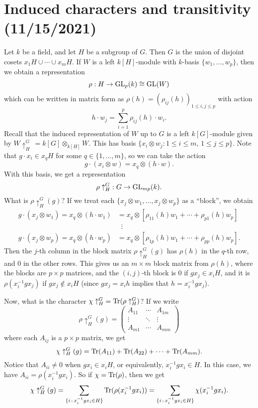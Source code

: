 \section{Induced characters and transitivity (11/15/2021)}
Let $k$ be a field, and let $H$ be a subgroup of $G$. Then $G$ is the 
union of disjoint cosets $x_1H \cup \cdots \cup x_mH$. If $W$ is a 
left $k[H]$-module with $k$-basis $\{w_1, \dots, w_p\}$, then we obtain 
a representation
\[ \rho : H \to \operatorname{GL}_p(k) \cong \operatorname{GL}(W) \] 
which can be written in matrix form as $\rho(h) = (\rho_{ij}(h))_{1\leq i,j\leq p}$
with action 
\[ h \cdot w_j = \sum_{i=1}^p \rho_{ij}(h) \cdot w_i. \] 
Recall that the induced representation of $W$ up to $G$ is a left $k[G]$-module 
given by $W \uparrow_H^G\,= k[G] \otimes_{k[H]} W$. This has basis 
$\{x_i \otimes w_j : 1 \leq i \leq m,\, 1 \leq j \leq p\}$. Note that 
$g \cdot x_i \in x_qH$ for some $q \in \{1, \dots, m\}$, so we can take the action 
\[ g \cdot (x_i \otimes w) = x_q \otimes (h \cdot w). \] 
With this basis, we get a representation 
\[ \rho \uparrow_H^G\;: G \to \operatorname{GL}_{mp}(k). \] 
What is $\rho \uparrow_H^G(g)$? If we treat each $\{x_j \otimes w_1, \dots, 
x_j \otimes w_p\}$ as a ``block'', we obtain 
\begin{align*}
    g \cdot (x_j \otimes w_1) = x_q \otimes (h \cdot w_1) &= 
    x_q \otimes [\rho_{11}(h) w_1 + \cdots + \rho_{p1}(h) w_p] \\ 
    &\;\;\vdots \\ 
    g \cdot (x_j \otimes w_p) = x_q \otimes (h \cdot w_p) &= 
    x_q \otimes [\rho_{1p}(h) w_1 + \cdots + \rho_{pp}(h) w_p]. 
\end{align*}
Then the $j$-th column in the block matrix $\rho \uparrow_H^G(g)$ has 
$\rho(h)$ in the $q$-th row, and $0$ in the other rows. This gives us 
an $m \times m$ block matrix from $\rho(h)$, where the blocks are 
$p \times p$ matrices, and the $(i, j)$-th block is $0$ if $gx_j \in x_i H$, 
and it is $\rho(x_i^{-1}gx_j)$ if $gx_j \notin x_i H$ (since 
$gx_j = x_ih$ implies that $h = x_i^{-1}gx_j$).

Now, what is the character $\chi \uparrow_H^G\;= \operatorname{Tr}(\rho \uparrow_H^G)$? 
If we write 
\[ \rho \uparrow_H^G(g) = \begin{pmatrix}
    A_{11} & \cdots & A_{1m} \\ 
    \vdots & \ddots & \vdots \\ 
    A_{m1} & \cdots & A_{mm}
\end{pmatrix} \] 
where each $A_{ij}$ is a $p \times p$ matrix, we get 
\[ \chi \uparrow_H^G(g) = \operatorname{Tr}(A_{11}) + \operatorname{Tr}(A_{22}) + \cdots + \operatorname{Tr}(A_{mm}). \] 
Notice that $A_{ii} \neq 0$ when $gx_i \in x_iH$, or equivalently, 
$x_i^{-1}gx_i \in H$. In this case, we have $A_{ii} = \rho(x_i^{-1}gx_i)$. 
So if $\chi = \operatorname{Tr}(\rho)$, then we get 
\[ \chi \uparrow_H^G(g) = \sum_{\{i\,:\,x_i^{-1}gx_i \in H\}} 
\operatorname{Tr}(\rho(x_i^{-1}gx_i)) = \sum_{\{i\,:\,x_i^{-1}gx_i \in H\}} \chi(x_i^{-1}gx_i). \] 

